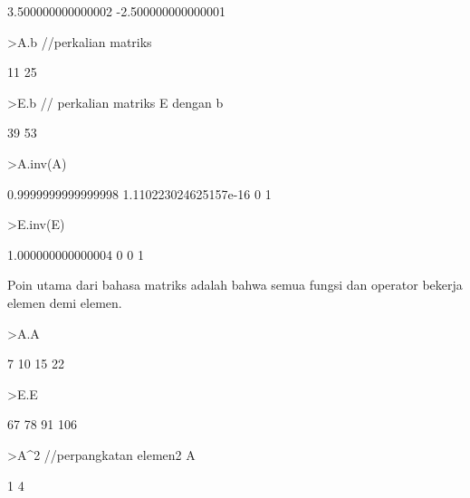 \documentclass[a4paper,10pt]{article}
\begin{document}
\begin{eulernotebook}
\begin{eulercomment}
\begin{eulercomment}
\begin{eulercomment}
\begin{eulercomment}
\begin{euleroutput}
        3.500000000000002      -2.500000000000001 
\end{euleroutput}
\begin{eulerprompt}
>A.b //perkalian matriks
\end{eulerprompt}
\begin{euleroutput}
                       11 
                       25 
\end{euleroutput}
\begin{eulerprompt}
>E.b // perkalian matriks E dengan b
\end{eulerprompt}
\begin{euleroutput}
                       39 
                       53 
\end{euleroutput}
\begin{eulerprompt}
>A.inv(A)
\end{eulerprompt}
\begin{euleroutput}
       0.9999999999999998   1.110223024625157e-16 
                        0                       1 
\end{euleroutput}
\begin{eulerprompt}
>E.inv(E)
\end{eulerprompt}
\begin{euleroutput}
        1.000000000000004                       0 
                        0                       1 
\end{euleroutput}
\begin{eulercomment}
Poin utama dari bahasa matriks adalah bahwa semua fungsi dan operator
bekerja elemen demi elemen.
\end{eulercomment}
\begin{eulerprompt}
>A.A
\end{eulerprompt}
\begin{euleroutput}
                        7                      10 
                       15                      22 
\end{euleroutput}
\begin{eulerprompt}
>E.E
\end{eulerprompt}
\begin{euleroutput}
                       67                      78 
                       91                     106 
\end{euleroutput}
\begin{eulerprompt}
>A^2 //perpangkatan elemen2 A
\end{eulerprompt}
\begin{euleroutput}
                        1                       4 

\end{euleroutput}
\end{eulercomment}
\end{eulercomment}
\end{eulercomment}
\end{eulercomment}
\end{eulernotebook}
\end{document}
